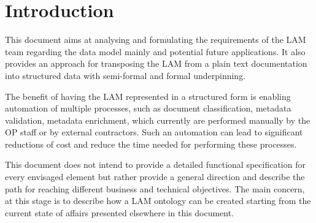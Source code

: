 \section{Introduction}\label{ariaid-title2}

This document aims at analysing and formulating the requirements of the
LAM team regarding the data model mainly and potential future
applications. It also provides an approach for transposing the LAM from
a plain text documentation into structured data with semi-formal and
formal underpinning.

The benefit of having the LAM represented in a structured form is
enabling automation of multiple processes, such as document
classification, metadata validation, metadata enrichment, which
currently are performed manually by the OP staff or by external
contractors. Such an automation can lead to significant reductions of
cost and reduce the time needed for performing these processes.

This document does not intend to provide a detailed functional
specification for every envisaged element but rather provide a general
direction and describe the path for reaching different business and
technical objectives. The main concern, at this stage is to describe how
a LAM ontology can be created starting from the current state of affairs
presented elsewhere in this document.
